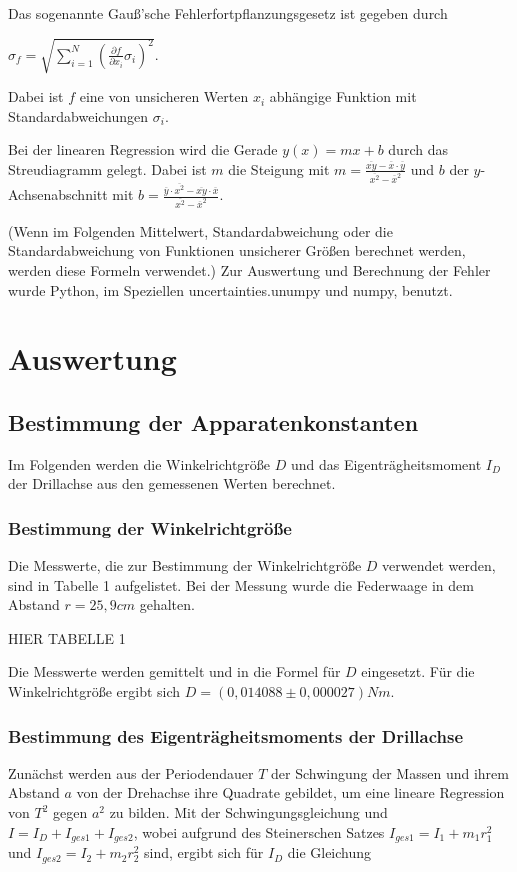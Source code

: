     Das sogenannte Gauß'sche Fehlerfortpflanzungsgesetz
    ist gegeben durch

    $\sigma_f = \sqrt{\sum_{i=1}^N (\frac{\partial f}{\partial x_i} \sigma_i)^2}$.

    Dabei ist $f$ eine von unsicheren Werten $x_i$
    abhängige Funktion mit Standardabweichungen $\sigma_i$.

    Bei der linearen Regression wird die Gerade
    $y(x) = mx + b$
    durch das Streudiagramm gelegt.
    Dabei ist $m$ die Steigung mit
    $m = \frac{\overline{xy} - \overline{x} \cdot \overline{y}}{\overline{x^2} - \overline{x}^2}$
    und $b$ der $y$-Achsenabschnitt mit
    $b = \frac{\overline{y} \cdot \overline{x^2} - \overline{xy} \cdot \overline{x}}{\overline{x^2} - \overline{x}^2}$.

    (Wenn im Folgenden Mittelwert, Standardabweichung
    oder die Standardabweichung von Funktionen unsicherer
    Größen berechnet werden, werden diese Formeln
    verwendet.)
    Zur Auswertung und Berechnung der Fehler
    wurde Python, im Speziellen uncertainties.unumpy
    und numpy, benutzt.

    \section{Auswertung}

    \subsection{Bestimmung der Apparatenkonstanten}
    Im Folgenden werden die Winkelrichtgröße $D$ und das Eigenträgheitsmoment
    $I_D$ der Drillachse aus den gemessenen Werten berechnet.

    \subsubsection{Bestimmung der Winkelrichtgröße}
    Die Messwerte, die zur Bestimmung der Winkelrichtgröße $D$ verwendet werden,
    sind in Tabelle 1 aufgelistet. Bei der Messung wurde die 
    Federwaage in dem Abstand $r = 25,9 cm$ gehalten.

    HIER TABELLE 1

    Die Messwerte werden gemittelt und in die Formel für $D$ eingesetzt.
    Für die Winkelrichtgröße ergibt sich
    $D = (0,014088 \pm 0,000027)Nm$.

    \subsubsection{Bestimmung des Eigenträgheitsmoments der Drillachse}
    Zunächst werden aus der Periodendauer $T$ der Schwingung der Massen
    und ihrem Abstand $a$ von der Drehachse ihre Quadrate gebildet, um
    eine lineare Regression von $T^2$ gegen $a^2$ zu bilden.
    Mit der Schwingungsgleichung und $I = I_D + I_{ges1} + I_{ges2}$, wobei
    aufgrund des Steinerschen Satzes
    $I_{ges1} = I_1 + m_1 r_1^2$ und $I_{ges2} = I_2 + m_2 r_2^2$ sind, ergibt sich
    für $I_D$ die Gleichung

